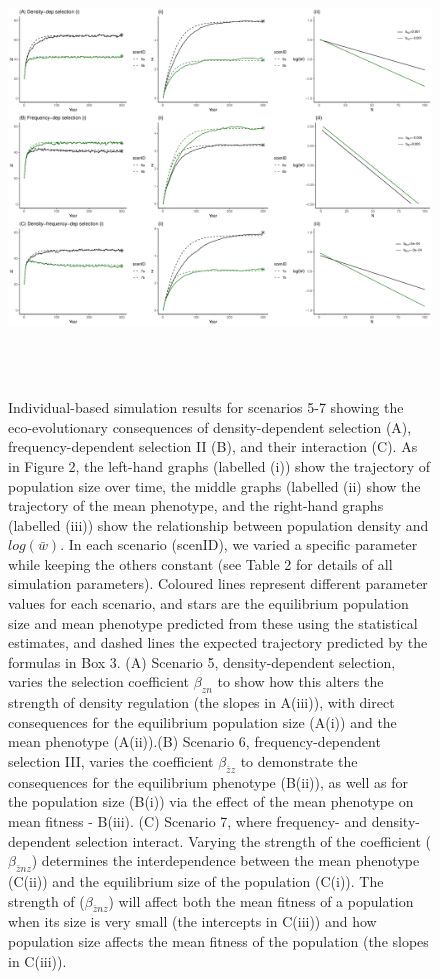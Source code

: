 \documentclass{article}
\begin{document}
	\newpage
	\begin{figure} [H]
	\renewcommand{\figurename}{Figure }
		\centering
		\includegraphics[width=12cm, height=12cm]{Figures/Fig4.pdf}
		\caption{Individual-based simulation results for scenarios 5-7 showing the eco-evolutionary consequences of density-dependent selection (A), frequency-dependent selection II (B), and their interaction (C). As in Figure 2, the left-hand graphs (labelled (i)) show the trajectory of population size over time, the middle graphs (labelled (ii) show the trajectory of the mean phenotype, and the right-hand graphs (labelled (iii)) show the relationship between population density and $log(\bar{w})$. In each scenario (scenID), we varied a specific parameter while keeping the others constant (see Table 2 for details of all simulation parameters). Coloured lines represent different parameter values for each scenario, and stars are the equilibrium population size and mean phenotype predicted from these using the statistical estimates, and dashed lines the expected trajectory predicted by the formulas in Box 3. (A) Scenario 5, density-dependent selection, varies the selection coefficient $\beta_{zn}$ to show how this alters the strength of density regulation (the slopes in A(iii)), with direct consequences for the equilibrium population size (A(i)) and the mean phenotype (A(ii)).(B) Scenario 6, frequency-dependent selection III, varies the coefficient $\beta_{\bar{z}z}$ to demonstrate the consequences for the equilibrium phenotype (B(ii)), as well as for the population size (B(i)) via the effect of the mean phenotype on mean fitness - B(iii). (C) Scenario 7, where frequency- and density-dependent selection interact. Varying the strength of the coefficient ($\beta_{\bar{z}nz}$) determines the interdependence between the mean phenotype (C(ii)) and the equilibrium size of the population (C(i)). The strength of ($\beta_{\bar{z}nz}$) will affect both the mean fitness of a population when its size is very small (the intercepts in C(iii)) and how population size affects the mean fitness of the population (the slopes in C(iii)).} 
		\label{fig:sim3}
	\end{figure}
	
\end{document}
